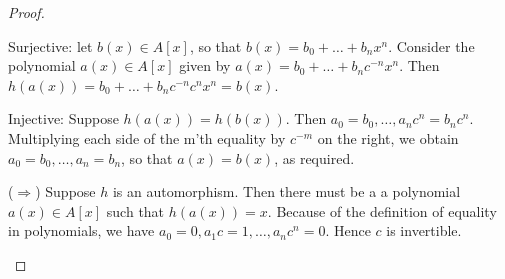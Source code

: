 \begin{proof}
\begin{enumerate}
    Surjective: let $b(x)\in A[x]$, so that $b(x)=b_0+\dots+b_nx^n$. Consider the polynomial $a(x)\in A[x]$ given by $a(x)=b_0+\dots+b_nc^{-n}x^{n}$. Then $h(a(x))=b_0+\dots+b_nc^{-n}c^nx^n=b(x)$.

    Injective: Suppose $h(a(x))=h(b(x))$. Then $a_0=b_0,\dots,a_nc^n=b_nc^n$. Multiplying each side of the m'th equality by $c^{-m}$ on the right, we obtain $a_0=b_0,\dots,a_n=b_n$, so that $a(x)=b(x)$, as required.

    ($\Rightarrow$) Suppose $h$ is an automorphism. Then there must be a a polynomial $a(x)\in A[x]$ such that $h(a(x))=x$. Because of the definition of equality in polynomials, we have $a_0=0,a_1c=1,\dots,a_nc^n=0$. Hence $c$ is invertible.
\end{enumerate}
\end{proof}

